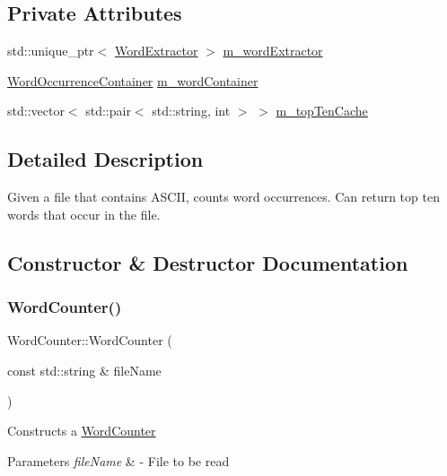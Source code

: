 \subsection*{Private Attributes}
\begin{DoxyCompactItemize}
\item 
std\+::unique\+\_\+ptr$<$ \mbox{\hyperlink{class_word_extractor}{Word\+Extractor}} $>$ \mbox{\hyperlink{class_word_counter_aefb9611fa991d6e0e7dccd64403150cb}{m\+\_\+word\+Extractor}}
\item 
\mbox{\hyperlink{class_word_occurrence_container}{Word\+Occurrence\+Container}} \mbox{\hyperlink{class_word_counter_a7f867e08264a28ccfc65972bc42e409b}{m\+\_\+word\+Container}}
\item 
std\+::vector$<$ std\+::pair$<$ std\+::string, int $>$ $>$ \mbox{\hyperlink{class_word_counter_af2184e7a0cae1bdd7a94e638dac64ed0}{m\+\_\+top\+Ten\+Cache}}
\end{DoxyCompactItemize}


\subsection{Detailed Description}
Given a file that contains A\+S\+C\+II, counts word occurrences. Can return top ten words that occur in the file. 

\subsection{Constructor \& Destructor Documentation}
\mbox{\label{class_word_counter_affea0f9dd574ac25eb447a161b4e9c22}} 
\subsubsection{\texorpdfstring{Word\+Counter()}{WordCounter()}}
{\footnotesize\ttfamily Word\+Counter\+::\+Word\+Counter (\begin{DoxyParamCaption}\item[{const std\+::string \&}]{file\+Name }\end{DoxyParamCaption})}

Constructs a \mbox{\hyperlink{class_word_counter}{Word\+Counter}} 
\begin{DoxyParams}{Parameters}
{\em file\+Name} & -\/ File to be read \\
\hline
\end{DoxyParams}

